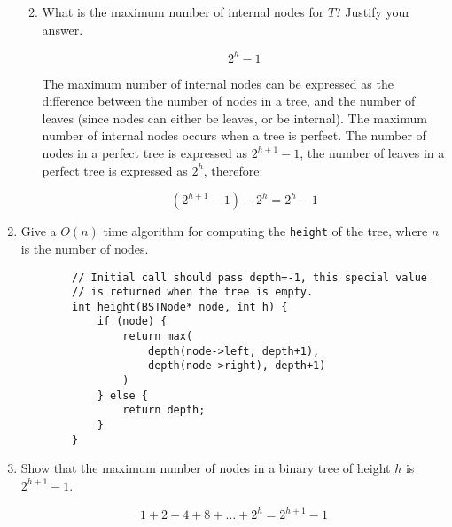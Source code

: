 \documentclass[11pt]{article}
\begin{document}
\begin{enumerate}
\begin{enumerate}
        \begin{center}
        \end{center}
        \vspace{0.5cm}
        
        \item What is the maximum number of internal nodes for $T$?  Justify your answer.

        $$ 2^h - 1 $$
        
        The maximum number of internal nodes can be expressed as the difference between the number of nodes in a tree, and the number of leaves (since nodes can either be leaves, or be internal). The maximum number of internal nodes occurs when a tree is perfect. The number of nodes in a perfect tree is expressed as $2^{h+1}-1$, the number of leaves in a perfect tree is expressed as $2^h$, therefore:

        $$ (2^{h+1}-1)-2^h = 2^h - 1 $$
    \end{enumerate}

    \item Give a $O(n)$ time algorithm for computing the \verb|height| of the tree, where $n$ is the number of nodes.

    \begin{verbatim}
        // Initial call should pass depth=-1, this special value
        // is returned when the tree is empty.
        int height(BSTNode* node, int h) {
            if (node) {
                return max(
                    depth(node->left, depth+1), 
                    depth(node->right), depth+1)
                )
            } else {
                return depth;
            }
        }
    \end{verbatim}

    \item Show that the maximum number of nodes in a binary tree of height $h$ is $2^{h+1}-1$.

    $$ 1 + 2 + 4 + 8 + \ldots + 2^h = 2^{h+1} - 1 $$

    \end{enumerate}
    
    \label{r:lastpage}
    
    
\end{document}
